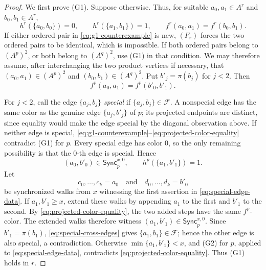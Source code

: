 \documentclass[10pt,a4paper]{amsart}
\numberwithin{equation}{section}
\theoremstyle{definition}
\theoremstyle{remark}
\begin{document}
\begin{proof}
We first prove (G1).  Suppose otherwise.  Thus, for suitable
$a_0,a_1\in A^r$ and $b_0,b_1\in A^r$,
\begin{equation}\label{eq:g1-counterexample}
 h^r(\{a_0,b_0\})=0,\qquad
 h^r(\{a_1,b_1\})=1,\qquad
 f^r(a_0,a_1)=f^r(b_0,b_1).
\end{equation}
If either ordered pair in \eqref{eq:g1-counterexample} is new, $(F_r)$
forces the two ordered pairs to be identical, which is impossible.
If both ordered pairs belong to $(A^p)^2$, or both belong to
$(A^q)^2$, use (G1) in that condition.  We may therefore assume,
after interchanging the two product vertices if necessary, that
$(a_0,a_1)\in(A^p)^2$ and $(b_0,b_1)\in(A^q)^2$.
Put $b'_j=\pi(b_j)$ for $j<2$.  Then
\begin{equation}\label{eq:projected-color-equality}
 f^p(a_0,a_1)=f^p(b'_0,b'_1).
\end{equation}

For $j<2$, call the edge $\{a_j,b_j\}$ \emph{special} if
$\{a_j,b_j\}\in\mathcal F$.  A nonspecial edge has the same color as the genuine
edge $\{a_j,b'_j\}$ of $p$; its projected endpoints are distinct,
since equality would make the edge special by the diagonal observation
above.  If neither
edge is special,
\eqref{eq:g1-counterexample}--\eqref{eq:projected-color-equality}
contradict (G1) for $p$.  Every special edge has color $0$, so the only
remaining possibility is that the $0$-th edge is special.  Hence
\begin{equation}\label{eq:special-edge-data}
 (a_0,b'_0)\in\mathsf{Sync}^{x,0}_p,\qquad
 h^p(\{a_1,b'_1\})=1.
\end{equation}
Let
\begin{displaymath}
 c_0,\ldots,c_k=a_0\quad\text{and}\quad
 d_0,\ldots,d_k=b'_0
\end{displaymath}
be synchronized walks from $x$ witnessing the first assertion in
\eqref{eq:special-edge-data}.  If $a_1,b'_1\geq x$, extend these walks
by appending $a_1$ to the first and $b'_1$ to the second.  By
\eqref{eq:projected-color-equality}, the two added steps have the same
$f^p$-color.  The extended walks therefore witness
$(a_1,b'_1)\in\mathsf{Sync}^{x,0}_p$.  Since $b'_1=\pi(b_1)$,
\eqref{eq:special-cross-edges} gives $\{a_1,b_1\}\in\mathcal F$; hence
the other edge is also special, a contradiction.  Otherwise
$\min\{a_1,b'_1\}<x$, and (G2) for $p$, applied to
\eqref{eq:special-edge-data}, contradicts
\eqref{eq:projected-color-equality}.  Thus (G1) holds in $r$.


\end{proof}
\end{document}
